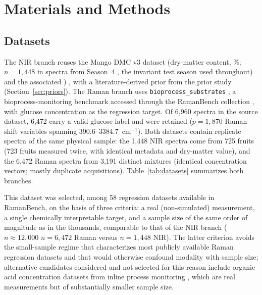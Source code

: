 \documentclass[preprint,12pt]{elsarticle}
\providecommand{\DIFaddtex}[1]{{\protect\color{blue} \sf #1}} %
\providecommand{\DIFdeltex}[1]{{\protect\color{red} \scriptsize #1}} %
\providecommand{\DIFaddbegin}{} %
\providecommand{\DIFaddend}{} %
\providecommand{\DIFdelbegin}{} %
\providecommand{\DIFdelend}{} %
\providecommand{\DIFadd}[1]{\texorpdfstring{\DIFaddtex{#1}}{#1}} %
\providecommand{\DIFdel}[1]{\texorpdfstring{\DIFdeltex{#1}}{}} %
\providecommand{\DIFscaledelfig}{0.5}
\newlength{\DIFdelgraphicswidth} %
\newlength{\DIFdelgraphicsheight} %
\providecommand{\DIFaddincludegraphics}[2][]{{\color{blue}\fbox{\DIFOincludegraphics[#1]{#2}}}} %
\providecommand{\DIFdelincludegraphics}[2][]{%
\sbox{\DIFdelgraphicsbox}{\DIFOincludegraphics[#1]{#2}}%
\settoboxwidth{\DIFdelgraphicswidth}{\DIFdelgraphicsbox} %
\settoboxtotalheight{\DIFdelgraphicsheight}{\DIFdelgraphicsbox} %
\scalebox{\DIFscaledelfig}{%
\parbox[b]{\DIFdelgraphicswidth}{\usebox{\DIFdelgraphicsbox}\\[-\baselineskip] \rule{\DIFdelgraphicswidth}{0em}}\llap{\resizebox{\DIFdelgraphicswidth}{\DIFdelgraphicsheight}{%
\setlength{\unitlength}{\DIFdelgraphicswidth}%
\begin{picture}(1,1)%
\thicklines\linethickness{2pt} %
{\color[rgb]{1,0,0}\put(0,0){\framebox(1,1){}}}%
{\color[rgb]{1,0,0}\put(0,0){\line( 1,1){1}}}%
{\color[rgb]{1,0,0}\put(0,1){\line(1,-1){1}}}%
\end{picture}%
}\hspace*{3pt}}} %
} %
\DeclareRobustCommand{\DIFaddbegin}{\DIFOaddbegin \let\includegraphics\DIFaddincludegraphics} %
\DeclareRobustCommand{\DIFaddend}{\DIFOaddend \let\includegraphics\DIFOincludegraphics} %
\DeclareRobustCommand{\DIFdelbegin}{\DIFOdelbegin \let\includegraphics\DIFdelincludegraphics} %
\DeclareRobustCommand{\DIFdelend}{\DIFOaddend \let\includegraphics\DIFOincludegraphics} %
\begin{document}
\section{Materials and Methods}
\label{sec:methods}

\subsection{Datasets}
\label{sec:datasets}

The NIR branch reuses the Mango DMC v3 dataset (dry-matter content, \%; $n=1{,}448$ \DIFdelbegin \DIFdel{in }\DIFdelend \DIFaddbegin \DIFadd{spectra from }\DIFaddend Season~4\DIFdelbegin \DIFdel{, the invariant test season used throughout) \cite{anderson2020}and the associated }\DIFdelend \DIFaddbegin \DIFadd{) \cite{anderson2020}, with a }\DIFaddend literature-derived prior \DIFdelbegin \DIFdel{from the prior study \cite{coelho_pgsg1,saranwong2004}}\DIFdelend \DIFaddbegin \DIFadd{\cite{saranwong2004} (Section~\ref{sec:priors})}\DIFaddend . The Raman branch uses \texttt{bioprocess\_substrates} \cite{lange2026}, a bioprocess-monitoring benchmark accessed through the RamanBench collection \cite{koddenbrock2026}, with glucose concentration as the regression target. Of 6,960 spectra in the source dataset, 6,472 carry a valid glucose label and were retained ($p=1{,}870$ Raman-shift variables spanning 390.6--3384.7~cm$^{-1}$). \DIFaddbegin \DIFadd{Both datasets contain replicate spectra of the same physical sample: the 1,448 NIR spectra come from 725 fruits (723 fruits measured twice, with identical metadata and dry-matter value), and the 6,472 Raman spectra from 3,191 distinct mixtures (identical concentration vectors; mostly duplicate acquisitions). }\DIFaddend Table~\ref{tab:datasets} summarizes both branches.

This dataset was selected, among 58 regression datasets available in RamanBench, on the basis of three criteria: a real (non-simulated) measurement, a single chemically interpretable target, and a sample size \DIFdelbegin \DIFdel{of the same order of magnitude as }\DIFdelend \DIFaddbegin \DIFadd{in the thousands, comparable to that of }\DIFaddend the NIR branch (\DIFdelbegin \DIFdel{$n\approx12{,}000$}\DIFdelend \DIFaddbegin \DIFadd{$n=6{,}472$ Raman versus $n=1{,}448$ NIR}\DIFaddend ). The latter criterion avoids the small-sample regime that characterizes most publicly available Raman regression datasets and that would otherwise confound modality with sample size; alternative candidates considered and not selected for this reason include organic-acid concentration datasets from inline process monitoring \cite{echtermeyer2021}, which are real measurements but of substantially smaller sample size.
\end{document}
